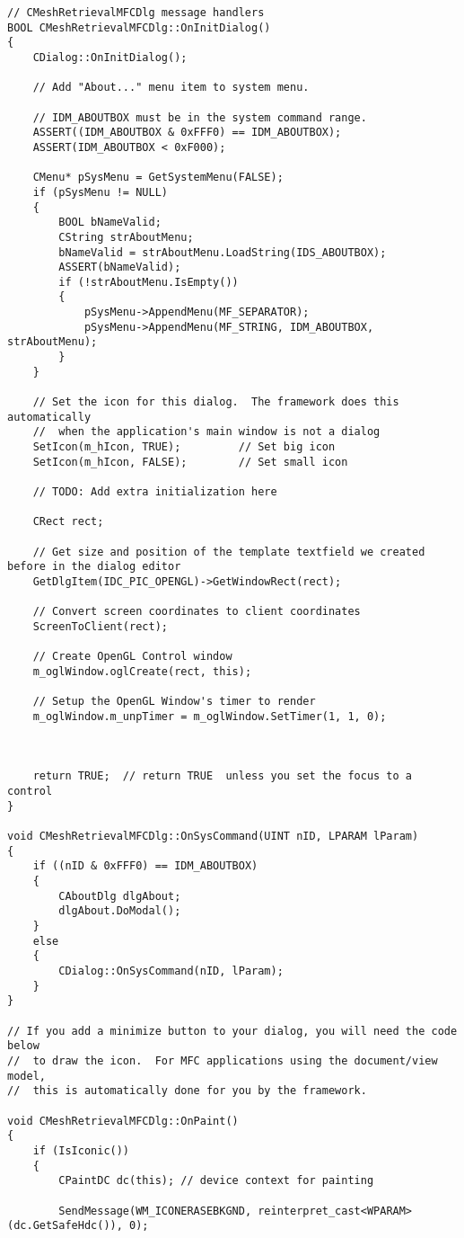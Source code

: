 \begin{enumerate}[1.]
\begin{lstlisting}[xleftmargin=0em]
// CMeshRetrievalMFCDlg message handlers
BOOL CMeshRetrievalMFCDlg::OnInitDialog()
{
	CDialog::OnInitDialog();

	// Add "About..." menu item to system menu.

	// IDM_ABOUTBOX must be in the system command range.
	ASSERT((IDM_ABOUTBOX & 0xFFF0) == IDM_ABOUTBOX);
	ASSERT(IDM_ABOUTBOX < 0xF000);

	CMenu* pSysMenu = GetSystemMenu(FALSE);
	if (pSysMenu != NULL)
	{
		BOOL bNameValid;
		CString strAboutMenu;
		bNameValid = strAboutMenu.LoadString(IDS_ABOUTBOX);
		ASSERT(bNameValid);
		if (!strAboutMenu.IsEmpty())
		{
			pSysMenu->AppendMenu(MF_SEPARATOR);
			pSysMenu->AppendMenu(MF_STRING, IDM_ABOUTBOX, strAboutMenu);
		}
	}

	// Set the icon for this dialog.  The framework does this automatically
	//  when the application's main window is not a dialog
	SetIcon(m_hIcon, TRUE);			// Set big icon
	SetIcon(m_hIcon, FALSE);		// Set small icon

	// TODO: Add extra initialization here

	CRect rect;

	// Get size and position of the template textfield we created before in the dialog editor
	GetDlgItem(IDC_PIC_OPENGL)->GetWindowRect(rect);

	// Convert screen coordinates to client coordinates
	ScreenToClient(rect);

	// Create OpenGL Control window
	m_oglWindow.oglCreate(rect, this);

	// Setup the OpenGL Window's timer to render
	m_oglWindow.m_unpTimer = m_oglWindow.SetTimer(1, 1, 0);



	return TRUE;  // return TRUE  unless you set the focus to a control
}

void CMeshRetrievalMFCDlg::OnSysCommand(UINT nID, LPARAM lParam)
{
	if ((nID & 0xFFF0) == IDM_ABOUTBOX)
	{
		CAboutDlg dlgAbout;
		dlgAbout.DoModal();
	}
	else
	{
		CDialog::OnSysCommand(nID, lParam);
	}
}

// If you add a minimize button to your dialog, you will need the code below
//  to draw the icon.  For MFC applications using the document/view model,
//  this is automatically done for you by the framework.

void CMeshRetrievalMFCDlg::OnPaint()
{
	if (IsIconic())
	{
		CPaintDC dc(this); // device context for painting

		SendMessage(WM_ICONERASEBKGND, reinterpret_cast<WPARAM>(dc.GetSafeHdc()), 0);


\end{lstlisting}
\end{enumerate}
